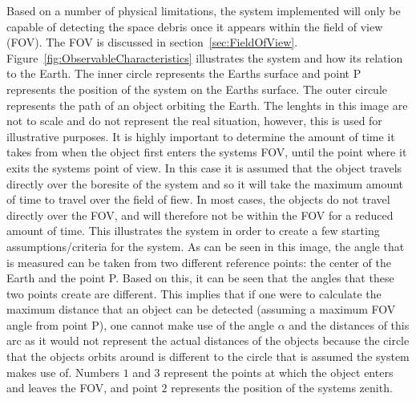 \documentclass[11pt]{witseiepaper}
\begin{document}
Based on a number of physical limitations, the system implemented will only be capable of detecting the space debris once it appears within the field of view (FOV). The FOV is discussed in section~\ref{sec:FieldOfView}. Figure~\ref{fig:ObservableCharacteristics} illustrates the system and how its relation to the Earth. 
The inner circle represents the Earths surface and point P represents the position of the system on the Earths surface.  
The outer circule represents the path of an object orbiting the Earth.
The lenghts in this image are not to scale and do not represent the real situation, however, this is used for illustrative purposes.
It is highly important to determine the amount of time it takes from when the object first enters the systems FOV, until the point where it exits the systems point of view.
In this case it is assumed that the object travels directly over the boresite of the system and so it will take the maximum amount of time to travel over the field of fiew. In most cases, the objects do not travel directly over the FOV, and will therefore not be within the FOV for a reduced amount of time.
This illustrates the system in order to create a few starting assumptions/criteria for the system.
As can be seen in this image, the angle that is measured can be taken from two different reference points: the center of the Earth and the point P. Based on this, it can be seen that the angles that these two points create are different. This implies that if one were to calculate the maximum distance that an object can be detected (assuming a maximum FOV angle from point P), one cannot make use of the angle $\alpha$ and the distances of this arc as it would not represent the actual distances of the objects because the circle that the objects orbits around is different to the circle that is assumed the system makes use of.
Numbers $1$ and $3$ represent the points at which the object enters and leaves the FOV, and point $2$ represents the position of the systems zenith.
\end{document}
